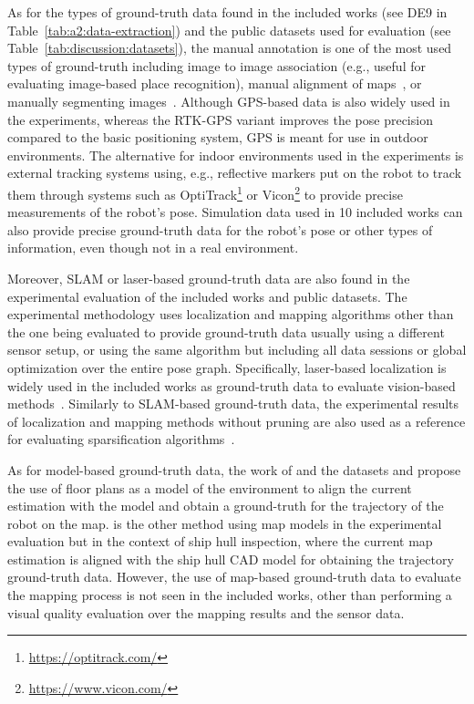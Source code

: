 As for the types of ground-truth data found in the included works (see DE9 in Table~\ref{tab:a2:data-extraction}) and the public datasets used for evaluation (see Table~\ref{tab:discussion:datasets}), the manual annotation is one of the most used types of ground-truth including image to image association (e.g., useful for evaluating image-based place recognition), manual alignment of maps~\parencite{biswas-veloso:2013:0278364913503892}, or manually segmenting images~\parencite{dataset:kitti}.
Although GPS-based data is also widely used in the experiments, whereas the RTK-GPS variant improves the pose precision compared to the basic positioning system, GPS is meant for use in outdoor environments. The alternative for indoor environments used in the experiments is external tracking systems using, e.g., reflective markers put on the robot to track them through systems such as OptiTrack\footnote{\url{https://optitrack.com/}} or Vicon\footnote{\url{https://www.vicon.com/}} to provide precise measurements of the robot's pose.
Simulation data used in 10 included works can also provide precise ground-truth data for the robot's pose or other types of information, even though not in a real environment.

Moreover, SLAM or laser-based ground-truth data are also found in the experimental evaluation of the included works and public datasets. The experimental methodology uses localization and mapping algorithms other than the one being evaluated to provide ground-truth data usually using a different sensor setup, or using the same algorithm but including all data sessions or global optimization over the entire pose graph.
Specifically, laser-based localization is widely used in the included works as ground-truth data to evaluate vision-based methods~\parencite{nuske-et-al:2009:20306}.
Similarly to SLAM-based ground-truth data, the experimental results of localization and mapping methods without pruning are also used as a reference for evaluating sparsification algorithms~\parencite{carlevaris-bianco-et-al:2014:2347571}.

As for model-based ground-truth data, the work of \cite{boniardi-et-al:2019:003} and the datasets  and  propose the use of floor plans as a model of the environment to align the current estimation with the model and obtain a ground-truth for the trajectory of the robot on the map.
\cite{ozog-et-al:2016:21582}  is the other method using map models in the experimental evaluation but in the context of ship hull inspection, where the current map estimation is aligned with the ship hull CAD model for obtaining the trajectory ground-truth data.
However, the use of map-based ground-truth data to evaluate the mapping process is not seen in the included works, other than performing a visual quality evaluation over the mapping results and the sensor data.





